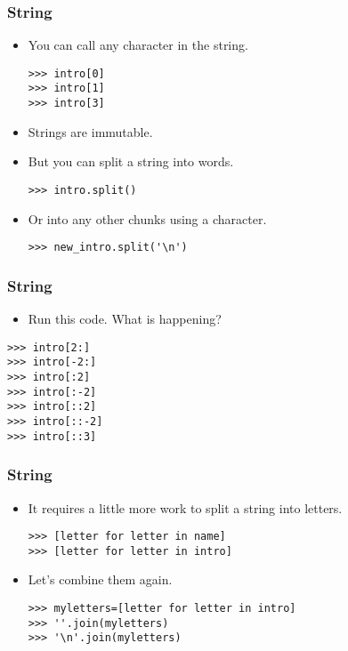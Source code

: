 \documentclass[xcolor=x11names,compress]{beamer}
\renewcommand{\(}{\begin{columns}}
\renewcommand{\)}{\end{columns}}
\newcommand{\<}[1]{\begin{column}{#1}}
\renewcommand{\>}{\end{column}}
\begin{document}
\begin{frame}[fragile]
 \frametitle{String}
 \begin{itemize}
 	\item You can call any character in the string. \pause
\begin{verbatim}
>>> intro[0]
>>> intro[1]
>>> intro[3]
\end{verbatim}
 \pause
 	\item Strings are immutable.  \pause
	\item But you can split a string into words. \pause
\begin{verbatim}
>>> intro.split()
\end{verbatim}
\pause
	 \item Or into any other chunks using a character. \pause
\begin{verbatim}
>>> new_intro.split('\n')
\end{verbatim} \pause
 \end{itemize}
\end{frame}

\begin{frame}[fragile]
\frametitle{String}
\begin{itemize}
\item Run this code. What is happening?\pause
\end{itemize}
\begin{verbatim}
>>> intro[2:]
>>> intro[-2:]
>>> intro[:2]
>>> intro[:-2]
>>> intro[::2]
>>> intro[::-2]
>>> intro[::3]
\end{verbatim}
\end{frame}

\begin{frame}[fragile]
  \frametitle{String}
  \begin{itemize}
  	\item It requires a little more work to split a string into letters. \pause
	\begin{verbatim}
>>> [letter for letter in name]
>>> [letter for letter in intro]
\end{verbatim} \pause
	\item Let's combine them again. \pause
	\begin{verbatim}
>>> myletters=[letter for letter in intro]
>>> ''.join(myletters)
>>> '\n'.join(myletters)
\end{verbatim}
  \end{itemize}
\end{frame}
\end{document}
